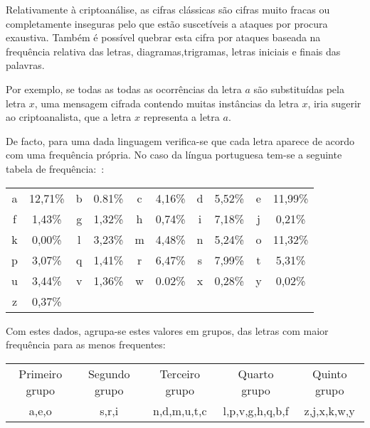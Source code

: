 Relativamente à criptoanálise, as cifras clássicas são cifras muito fracas ou completamente inseguras pelo que estão suscetíveis a ataques por procura exaustiva. Também é possível quebrar esta cifra por ataques baseada na frequência relativa das letras, diagramas,trigramas, letras iniciais e finais das palavras.

Por exemplo, se todas as todas as ocorrências da letra $a$ são substituídas pela letra $x$, uma mensagem cifrada contendo muitas instâncias da letra $x$, iria sugerir ao criptoanalista, que a letra $x$ representa a letra $a$.

De facto, para uma dada linguagem verifica-se que cada letra aparece de acordo com uma frequência própria. No caso da língua portuguesa tem-se a seguinte tabela de frequência:~\cite{Quaresma2009a}:

\begin{table}[h]
\centering
\begin{tabular}{>{\columncolor{gray!20}}cccccccccc}
a & 12,71\% & \cellcolor{gray!20}b & 0.81\% & \cellcolor{gray!20}c & 4,16\% & \cellcolor{gray!20}d  & 5,52\% & \cellcolor{gray!20}e & 11,99\% \\
f & 1,43\% & \cellcolor{gray!20}g & 1,32\% & \cellcolor{gray!20}h & 0,74\% & \cellcolor{gray!20}i  & 7,18\% & \cellcolor{gray!20}j & 0,21\% \\
k & 0,00\% & \cellcolor{gray!20}l & 3,23\% & \cellcolor{gray!20}m & 4,48\% & \cellcolor{gray!20}n  & 5,24\% & \cellcolor{gray!20}o & 11,32\% \\
p & 3,07\% & \cellcolor{gray!20}q & 1,41\% & \cellcolor{gray!20}r & 6,47\% & \cellcolor{gray!20}s  & 7,99\% & \cellcolor{gray!20}t & 5,31\% \\
u & 3,44\%  & \cellcolor{gray!20}v & 1,36\% & \cellcolor{gray!20}w & 0.02\% & \cellcolor{gray!20}x  & 0,28\% & \cellcolor{gray!20}y & 0,02\% \\
z & 0,37\% & & & & & &  & & \\
\end{tabular}
\end{table}

Com estes dados, agrupa-se estes valores em grupos, das letras com maior frequência para as menos frequentes:

\begin{table}[h]
\centering
\begin{tabular}{>{\columncolor{gray!20}}ccccc}
Primeiro grupo  & \cellcolor{gray!20}Segundo grupo & \cellcolor{gray!20}Terceiro grupo & \cellcolor{gray!20}Quarto grupo  & \cellcolor{gray!20}Quinto grupo\\
a,e,o &s,r,i & n,d,m,u,t,c &  l,p,v,g,h,q,b,f  & z,j,x,k,w,y\\
\end{tabular}
\end{table}

